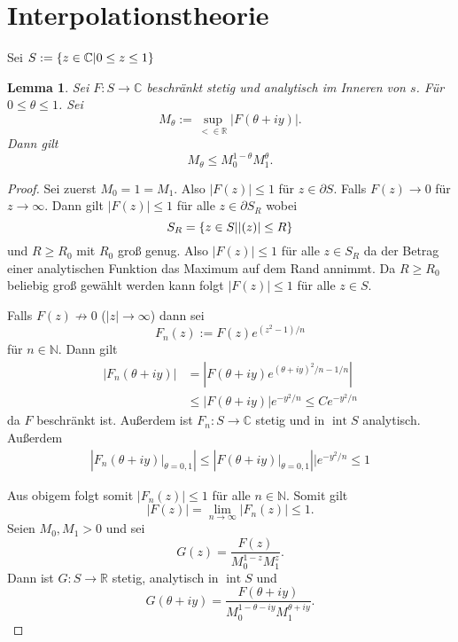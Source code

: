 \documentclass[
paper=a4,
bibtotocnumbered,
liststotocnumbered,
tablecaptionabove,
pointlessnumbers,
twoside,
openright,
10pt
]
{report}
\let\Re\relax\let\Im\relax
\DeclareMathOperator{\Re}{Re}
\DeclareMathOperator{\Im}{Im}
\newtheorem{lem}[thm]{Lemma}
\theoremstyle{definition}
\numberwithin{equation}{chapter}
\begin{document}
\section{Interpolationstheorie}
Sei $S:=\{z\in \mathbb C|0\le \Re z \le 1\}$
\begin{lem}
Sei $F:S\to \mathbb C$ beschränkt stetig und analytisch im Inneren von $s$. Für $0\le \theta\le 1$. Sei 
\begin{equation}
M_\theta:= \sup_{<\in \mathbb R} |F(\theta+iy)|.
\end{equation}
Dann gilt
\begin{equation}
M_\theta \le M_0^{1-\theta} M_1^\theta.
\end{equation}
\end{lem}

\begin{proof}
Sei zuerst $M_0=1=M_1$. Also $|F(z)|\le 1$ für $z\in \partial S$. Falls $F(z)\to 0$ für $z\to \infty$. Dann gilt $|F(z)|\le 1$ für alle $z\in \partial S_R$ wobei
\begin{equation}
S_R = \{z\in S| |\Im(z)|\le R\}
\end{equation} 
und $R\ge R_0$ mit $R_0$ groß genug. Also $|F(z)|\le 1$ für alle $z\in S_R$ da der Betrag einer analytischen Funktion das Maximum auf dem Rand annimmt. Da $R\ge R_0$ beliebig groß gewählt werden kann folgt $|F(z)|\le 1$ für alle $z\in S$.

Falls $F(z)\not \to 0$ ($|z|\to \infty$) dann sei
\begin{equation}
F_n(z):= F(z) e^{(z^2-1)/n}
\end{equation}
für $n\in \mathbb N$. Dann gilt
\begin{align}
|F_n(\theta + i y)| &= \left | F(\theta + i y) e^{(\theta+iy)^2/n -1/n} \right |\\
&\le | F(\theta + iy) | e^{-y^2/n} \le C e^{-y^2/n}
\end{align}
da $F$ beschränkt ist.  Außerdem ist $F_n: S\to \mathbb C$ stetig und in $\operatorname{int} S$ analytisch. Außerdem
\begin{align}
\left|F_n(\theta + iy)\big| _{\theta=0,1}\right| \le | F(\theta +iy)\big |_{\theta=0,1} || e^{-y^2/n} \le 1
\end{align}

Aus obigem folgt somit $|F_n(z)|\le 1$ für alle $n\in \mathbb N$. Somit gilt
\begin{equation}
|F(z)|=\lim_{n\to \infty} |F_n(z)|\le 1.
\end{equation}
Seien $M_0, M_1>0$ und sei
\begin{equation}
G(z) = \frac{F(z)}{M_0^{1-z} M_1^z}.
\end{equation}
Dann ist $G: S\to \mathbb R$ stetig, analytisch in $\operatorname{int} S$ und
\begin{equation}
G(\theta +iy) = \frac{F(\theta +iy)}{M_0^{1-\theta-iy} M_1^{\theta+iy}}.
\end{equation} 


\end{proof}
\end{document}
